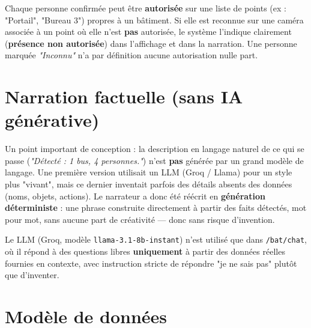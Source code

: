 \documentclass[11pt,a4paper]{article}
\begin{document}
Chaque personne confirm\'ee peut \^etre \textbf{autoris\'ee} sur une liste de points (ex : "Portail",
"Bureau 3") propres \`a un b\^atiment. Si elle est reconnue sur une cam\'era associ\'ee \`a un point
o\`u elle n'est \textbf{pas} autoris\'ee, le syst\`eme l'indique clairement
(\textbf{présence non autorisée}) dans l'affichage et dans la narration. Une personne marqu\'ee
\emph{"Inconnu"} n'a par d\'efinition aucune autorisation nulle part.

\section{Narration factuelle (sans IA g\'en\'erative)}

Un point important de conception : la description en langage naturel de ce qui se passe
(\emph{"D\'etect\'e : 1 bus, 4 personnes."}) n'est \textbf{pas} g\'en\'er\'ee par un grand mod\`ele de
langage. Une premi\`ere version utilisait un LLM (Groq / Llama) pour un style plus "vivant", mais ce
dernier inventait parfois des d\'etails absents des donn\'ees (noms, objets, actions). Le narrateur a
donc \'et\'e r\'e\'ecrit en \textbf{g\'en\'eration d\'eterministe} : une phrase construite directement \`a
partir des faits d\'etect\'es, mot pour mot, sans aucune part de cr\'eativit\'e — donc sans risque
d'invention.

\begin{notecard}
Le LLM (Groq, mod\`ele \texttt{llama-3.1-8b-instant}) n'est utilis\'e que dans \texttt{/bat/chat}, o\`u il
r\'epond \`a des questions libres \textbf{uniquement} \`a partir des donn\'ees r\'eelles fournies en
contexte, avec instruction stricte de r\'epondre "je ne sais pas" plut\^ot que d'inventer.
\end{notecard}

\section{Mod\`ele de donn\'ees}

\begin{center}
\end{center}
\end{document}
